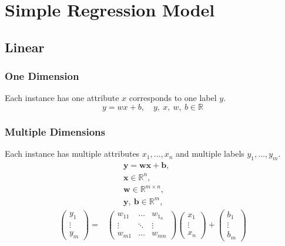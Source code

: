 \documentclass{article}
\begin{document}
    \section{Simple Regression Model}
        \subsection{Linear}
            \subsubsection{One Dimension}
                Each instance has one attribute $x$ corresponds to one label $y$. 
                \[
                    y=wx+b,\quad y,~x,~w,~b\in\mathbb{R}
                \]
            \subsubsection{Multiple Dimensions}
                Each instance has multiple attributes $x_1,\dots,x_n$ and multiple labels $y_1,\dots,y_m$.
                \begin{align*}
                    &\qquad\boldsymbol{y}=\boldsymbol{wx}+\boldsymbol{b},\\
                    &\qquad\boldsymbol{x}\in\mathbb{R}^n, \\
                    &\qquad\boldsymbol{w}\in\mathbb{R}^{m\times n},\\
                    &\qquad\boldsymbol{y},~\boldsymbol{b}\in\mathbb{R}^m,\\
                    \begin{pmatrix}
                        y_1\\
                        \vdots\\
                        y_m
                    \end{pmatrix}=&\begin{pmatrix}
                        w_{11} & \dots & w_{1_n}\\
                        \vdots & \ddots & \vdots\\
                        w_{m1} & \dots & w_{mn}
                    \end{pmatrix}\begin{pmatrix}
                        x_1\\
                        \vdots\\
                        x_n
                    \end{pmatrix}+\begin{pmatrix}
                        b_1\\
                        \vdots\\
                        b_m
                    \end{pmatrix}
                \end{align*}
\end{document}
